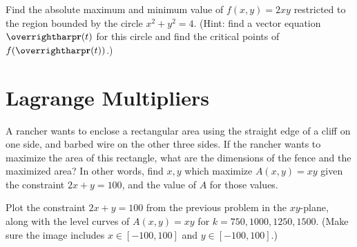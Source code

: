 \documentclass[letterpaper, twoside, 12pt]{book}
\begin{document}
          \begin{solution}

          \end{solution}

          \begin{problem}
            Find the absolute maximum and minimum value of
            $f(x,y)=2xy$ restricted to the region bounded by
            the circle $x^2+y^2=4$. (Hint: find a vector equation $\vect{r}(t)$
            for this circle and find the critical points of $f(\vect{r}(t))$.)
          \end{problem}

          \begin{solution}

          \end{solution}


\section{Lagrange Multipliers} %

          \begin{problem}
            A rancher wants to enclose a rectangular area using the
            straight edge of a cliff on one side, and barbed wire on
            the other three sides. If the rancher wants to maximize
            the area of this rectangle, what are the dimensions of the
            fence and the maximized area? In other words, find $x,y$ which
            maximize $A(x,y)=xy$ given the constraint $2x+y=100$, and
            the value of $A$ for those values.
          \end{problem}

          \begin{solution}

          \end{solution}

          \begin{problem}
            Plot the constraint $2x+y=100$ from the previous problem in
            the $xy$-plane, along with the level curves of $A(x,y)=xy$
            for $k=750,1000,1250,1500$. (Make sure the image includes
            $x\in[-100,100]$ and $y\in[-100,100]$.)
          \end{problem}

          \begin{solution}

          \end{solution}
\end{document}
